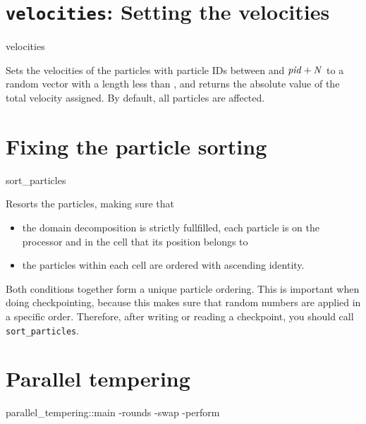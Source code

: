 \section{\texttt{velocities}: Setting the velocities}
\begin{essyntax}
  velocities  
\end{essyntax}
Sets the velocities of the particles with particle IDs between
 and $\var{pid}+\var{N}$ to a random vector with a length
less than , and returns the absolute value of the
total velocity assigned. By default, all particles are affected.

\section{Fixing the particle sorting}
\begin{essyntax}
  sort_particles
\end{essyntax}

Resorts the particles, making sure that
\begin{itemize}
\item the domain decomposition is strictly fullfilled, \ie{} each
   particle is on the processor and in the cell that its
   position belongs to
\item the particles within each cell are ordered with ascending
identity.
\end{itemize}
Both conditions together form a unique particle ordering. This is
important when doing checkpointing, because this makes sure that
random numbers are applied in a specific order. Therefore, after
writing or reading a checkpoint, you should call \texttt{sort_particles}.

\section{Parallel tempering}
\begin{essyntax}
  parallel_tempering::main
  -rounds 
  -swap 
  -perform 
\end{essyntax}

